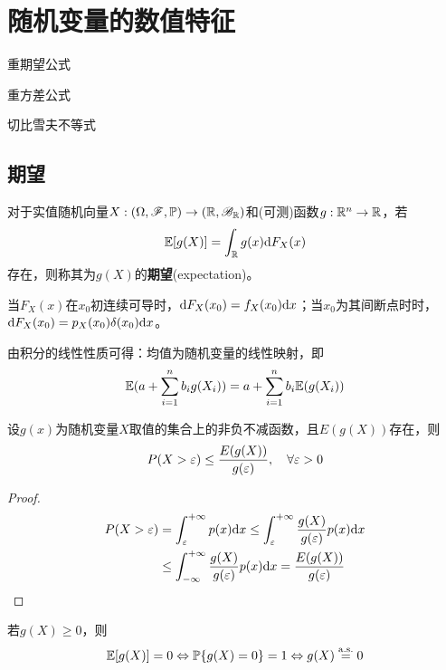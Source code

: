 \chapter{随机变量的数值特征}
\begin{introduction}[考试重点]
    \item 重期望公式
    \item 重方差公式
    \item 切比雪夫不等式
\end{introduction}
\section{期望}

\begin{definition}[期望]
    对于实值随机向量$X : (\Omega,\mathscr{F},\mathbb{P}) \to (\mathbb{R},\mathscr{B}_{\mathbb{R}})$和(可测)函数$g : \mathbb{R}^n \to \mathbb{R}$，若
    \[ \mathbb{E}[g(X)] = \int_{\mathbb{R}} g(x) \mathrm{d} F_X(x) \]
    存在，则称其为$g(X)$的\textbf{期望}(expectation)。
\end{definition}

\begin{remark}
    当$F_X(x)$在$x_0$初连续可导时，$\mathrm{d} F_X(x_0)=f_X(x_0)\mathrm{d} x$；当$x_0$为其间断点时时，$\mathrm{d} F_X(x_0)=p_{X}(x_0)\delta(x_0)\mathrm{d} x$。
\end{remark}


\begin{proposition}[期望的线性性质]
    由积分的线性性质可得：均值为随机变量的线性映射，即
    \[ \mathbb{E}(a+\sum_{i=1}^n b_i g(X_i))=a+\sum_{i=1}^n b_i \mathbb{E}(g(X_i)) \]
\end{proposition}

\begin{theorem}[Markov不等式]
    设$g(x)$为随机变量$X$取值的集合上的非负不减函数，且$E(g(X))$存在，则
    \[ P(X>\varepsilon) \leq \frac{E(g(X))}{g(\varepsilon)} ,\quad \forall \varepsilon > 0\]
\end{theorem}
\begin{proof}
    \begin{align*}
        P(X>\varepsilon) & =\int_{\varepsilon}^{+\infty}p(x) \mathrm{d} x \leq \int_{\varepsilon}^{+\infty}\frac{g(X)}{g(\varepsilon)}p(x) \mathrm{d} x \\
                & \leq \int_{-\infty}^{+\infty}\frac{g(X)}{g(\varepsilon)}p(x) \mathrm{d} x = \frac{E(g(X))}{g(\varepsilon)}
    \end{align*}
\end{proof}

\begin{corollary}
    若$g(X) \ge 0$，则
    \[ \mathbb{E}[g(X)] = 0 \Leftrightarrow  \mathbb{P}\{g(X)=0\} = 1 \Leftrightarrow g(X) \overset{\mathrm{a.s.}}{=} 0 \]
\end{corollary}

